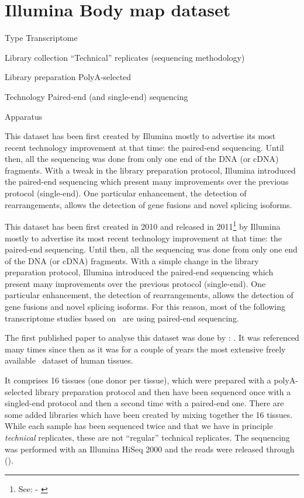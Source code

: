 \chapter{Illumina Body map dataset}
\label{ch:IBMData}

\begin{eqlist}
    \item[Type] Transcriptome
    \item[Library collection] ``Technical'' replicates (sequencing methodology)
    \item[Library preparation] PolyA-selected
    \item[Technology] Paired-end (and single-end) sequencing
    \item[Apparatus]
\end{eqlist}

This dataset has been first created by Illumina mostly to advertise its most
recent technology improvement at that time: the paired-end sequencing.  Until
then, all the sequencing was done from only one end of the \gls{DNA} (or
\gls{cDNA}) fragments. With a tweak in the library preparation protocol, Illumina
introduced the paired-end sequencing which present many improvements over the
previous protocol (single-end). One particular enhancement, the detection of
rearrangements, allows the detection of gene fusions and novel splicing isoforms.


This dataset has been first created in 2010 and released in
2011\footnote{See:  - \cite{ibmEnsembl}} by Illumina
mostly to advertise its most recent technology improvement at that time:
the paired-end sequencing.
Until then, all the sequencing was done from only one end of the \gls{DNA} (or
\gls{cDNA}) fragments. With a simple change in the library preparation protocol,
Illumina introduced the paired-end sequencing which present many improvements
over the previous protocol (single-end). One particular enhancement, the
detection of rearrangements, allows the detection of gene fusions and
novel splicing isoforms. For this reason, most of the following transcriptome
studies based on \Rnaseq\ are using paired-end sequencing.

The first published paper to analyse this dataset was done by
\citet{ibmrelatedpaper}: .
It was referenced many times since then as it was for a couple of years
the most extensive freely available \Rnaseq\ dataset of human tissues.

It comprises 16 tissues (one donor per tissue), which were prepared with a
polyA-selected library preparation protocol and then have been sequenced once
with a singled-end protocol and then a second time with a paired-end one. There
are some added libraries which have been created by mixing together the 16 tissues.
While each sample has been sequenced twice and that we have in principle
\emph{technical} replicates, these are not ``regular'' technical
replicates.
The sequencing was performed with an Illumina HiSeq 2000 and the reads were
released through  ().

